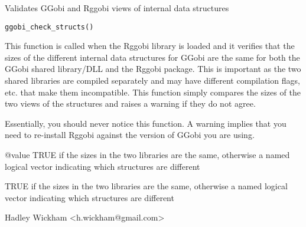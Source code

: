 \documentclass{article}
\begin{document}
\begin{Description}\relax
Validates GGobi and Rggobi views of internal data structures
\end{Description}
\begin{Usage}
\begin{verbatim}ggobi_check_structs()\end{verbatim}
\end{Usage}
\begin{Arguments}
\end{Arguments}
\begin{Details}\relax
This function is called when the Rggobi library is loaded and it verifies
that the sizes of the different internal data structures for GGobi are the
same for both the GGobi shared library/DLL and the Rggobi package. This is
important as the two shared libraries are compiled separately and may have
different compilation flags, etc. that make them incompatible. This
function simply compares the sizes of the two views of the structures and
raises a warning if they do not agree.

Essentially, you should never notice this function. A warning implies that
you need to re-install Rggobi against the version of GGobi you are using.

@value TRUE if the sizes in the two libraries are the same, otherwise a named logical vector indicating which structures are different
\end{Details}
\begin{Value}
TRUE if the sizes in the two libraries are the same, otherwise a named logical vector indicating which structures are different
\end{Value}
\begin{Author}\relax
Hadley Wickham <h.wickham@gmail.com>
\end{Author}
\begin{Examples}
\begin{ExampleCode}\end{ExampleCode}
\end{Examples}
\end{document}
